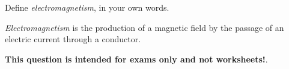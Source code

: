 

Define {\it electromagnetism}, in your own words.







{\it Electromagnetism} is the production of a magnetic field by the passage of an electric current through a conductor.







{\bf This question is intended for exams only and not worksheets!}.



